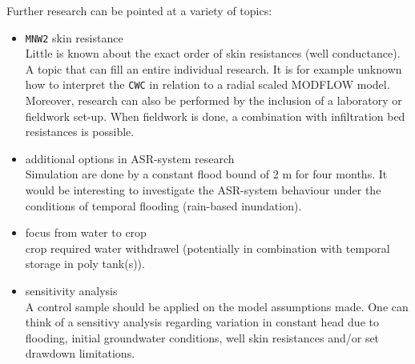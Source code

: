 Further research can be pointed at a variety of topics:
\begin{itemize}
\item{\texttt{MNW2} skin resistance}\\
Little is known about the exact order of skin resistances (well conductance). A topic that can fill an entire individual research. It is for example unknown how to interpret the \texttt{CWC} in relation to a radial scaled MODFLOW model. Moreover, research can also be performed by the inclusion of a laboratory or fieldwork set-up. When fieldwork is done, a combination with infiltration bed resistances is possible. 
\item{additional options in ASR-system research}\\
Simulation are done by a constant flood bound of 2 m for four months. It would be interesting to investigate the ASR-system behaviour under the conditions of temporal flooding (rain-based inundation). 
\item{focus from water to crop}\\
crop required water withdrawel (potentially in combination with temporal storage in poly tank(s)). 
\item{sensitivity analysis}\\
A control sample should be applied on the model assumptions made. One can think of a sensitivy analysis regarding variation in constant head due to flooding, initial groundwater conditions, well skin resistances and/or set drawdown limitations. 
\end{itemize}